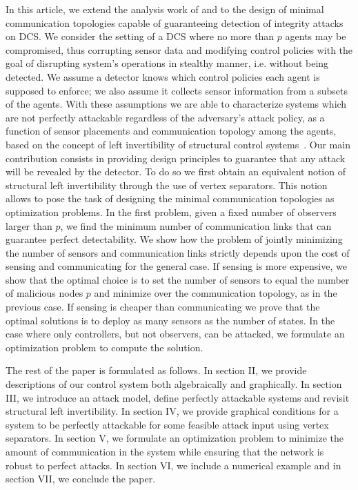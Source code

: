 \documentclass[letterpaper, 10 pt, conference]{ieeeconf}
\begin{document}
In this article, we extend the analysis work of \cite{Cam2014} and \cite{PasqualettiAttack} to the design of minimal communication topologies capable of guaranteeing detection of integrity attacks on DCS. We consider the setting of a DCS where no more than $p$ agents may be compromised, thus corrupting sensor data and modifying control policies with the goal of disrupting system's operations in stealthy manner, i.e. without being detected. We assume a detector knows which control policies each agent is supposed to enforce; we also assume it collects sensor information from a subsets of the agents. With these assumptions we are able to characterize systems which are not perfectly attackable regardless of the adversary's attack policy, as a function of sensor placements and communication topology among the agents, based on the concept of left invertibility of structural control systems~\cite{Cam2014, PasqualettiAttack}. Our main contribution consists in providing design principles to guarantee that any attack will be revealed by the detector. To do so we first obtain an equivalent notion of structural left invertibility through the use of vertex separators. This notion allows to pose the task of designing the minimal communication topologies as optimization problems. In the first problem, given a fixed number of observers larger than $p$, we find the minimum number of communication links that can guarantee perfect detectability. We show how the  problem of jointly minimizing the number of sensors and communication links strictly depends upon the cost of sensing and communicating for the general case. If sensing is more expensive, we show that the optimal choice is to set the number of sensors to equal the number of malicious nodes $p$ and minimize over the communication topology, as in the previous case. If sensing is cheaper than communicating we prove that the optimal solutions is to deploy as many sensors as the number of states. In the case where only controllers, but not observers, can be attacked, we formulate an optimization problem to compute the solution.


The rest of the paper is formulated as follows. In section II, we provide descriptions of our control system both algebraically and graphically. In section III, we introduce an attack model, define perfectly attackable systems and revisit structural left invertibility. In section IV, we provide graphical conditions for a system to be perfectly attackable for some feasible attack input using vertex separators. In section V, we formulate an optimization problem to minimize the amount of communication in the system while ensuring that the network is robust to perfect attacks. In section VI, we include a numerical example and in section VII, we conclude the paper.
\end{document}
